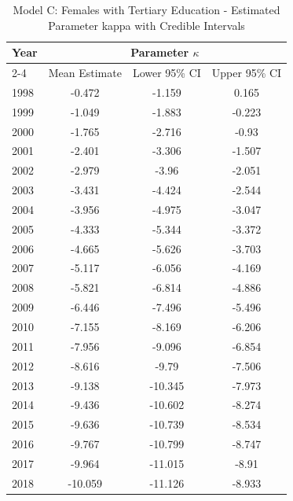 \begin{landscape}
\begin{table}[htbp]
\centering
\caption{Model C: Females with Tertiary Education - Estimated Parameter kappa  with Credible Intervals}
\label{tab:parameters_k20}
\begin{tabular}{@{}lccc@{}}
\toprule
Year & \multicolumn{3}{c}{Parameter \(\kappa\)} \\
\cmidrule(lr){2-4}
      & Mean Estimate & Lower 95\% CI & Upper 95\% CI \\
\midrule
1998 & -0.472 & -1.159 & 0.165 \\
1999 & -1.049 & -1.883 & -0.223 \\
2000 & -1.765 & -2.716 & -0.93 \\
2001 & -2.401 & -3.306 & -1.507 \\
2002 & -2.979 & -3.96 & -2.051 \\
2003 & -3.431 & -4.424 & -2.544 \\
2004 & -3.956 & -4.975 & -3.047 \\
2005 & -4.333 & -5.344 & -3.372 \\
2006 & -4.665 & -5.626 & -3.703 \\
2007 & -5.117 & -6.056 & -4.169 \\
2008 & -5.821 & -6.814 & -4.886 \\
2009 & -6.446 & -7.496 & -5.496 \\
2010 & -7.155 & -8.169 & -6.206 \\
2011 & -7.956 & -9.096 & -6.854 \\
2012 & -8.616 & -9.79 & -7.506 \\
2013 & -9.138 & -10.345 & -7.973 \\
2014 & -9.436 & -10.602 & -8.274 \\
2015 & -9.636 & -10.739 & -8.534 \\
2016 & -9.767 & -10.799 & -8.747 \\
2017 & -9.964 & -11.015 & -8.91 \\
2018 & -10.059 & -11.126 & -8.933 \\
\bottomrule
\end{tabular}
\end{table}
\end{landscape}